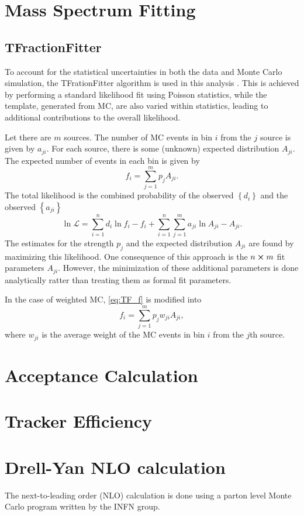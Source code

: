 \documentclass[../main.tex]{subfiles}
\begin{document}
\section{Mass Spectrum Fitting}

\subsection{TFractionFitter}
To account for the statistical uncertainties in both the data and Monte Carlo
simulation, the TFrationFitter algorithm is used in this analysis .
This is achieved by performing a standard likelihood fit using Poisson statistics,
while the template, generated from MC, are also varied within statistics, leading 
to additional contributions to the overall likelihood.

Let there are $m$ sources. The number of MC events in bin $i$ from the $j$ source
is given by $a_{ji}$. For each source, there is some (unknown) expected distribution
$A_{ji}$. The expected number of events in each bin is given by 
\begin{equation}
	f_i = \sum^m_{j=1} p_j A_{ji}.
	\label{eq:TF_f}
\end{equation}
The total likelihood is the combined probability of the observed $\left\{d_i\right\}$
and the observed $\left\{a_{ji}\right\}$
\begin{equation}
	\ln \mathcal{L} = \sum^n_{i=1} d_i \ln f_i -f_i + \sum^n_{i=1} \sum^m_{j=1} a_{ji} \ln A_{ji} - A_{ji}.
	\label{eq:TF_likelihood}
\end{equation}
The estimates for the strength $p_j$ and the expected distribution $A_{ji}$ are 
found by maximizing this likelihood. One consequence of this approach is the
$n \cross m$ fit parameters $A_{ji}$. However, the  minimization of these additional
parameters is done analytically ratter than treating them as formal fit parameters.

In the case of weighted MC, \cref{eq:TF_f} is modified into
\begin{equation}
	f_i = \sum^m_{j=1} p_j w_{ji}A_{ji},
\end{equation}
where $w_{ji}$ is the average weight of the MC events in bin $i$ from the $j$th source.

\section{Acceptance Calculation}

\section{Tracker Efficiency}

\section{Drell-Yan NLO calculation}
The next-to-leading order (NLO) calculation is done using a parton level Monte
Carlo program written by the INFN group\cite{catani2009,catani2007}.

\ifSubfilesClassLoaded{ \printbibliography[heading=bibintoc,title={References}]}{}
\end{document}

